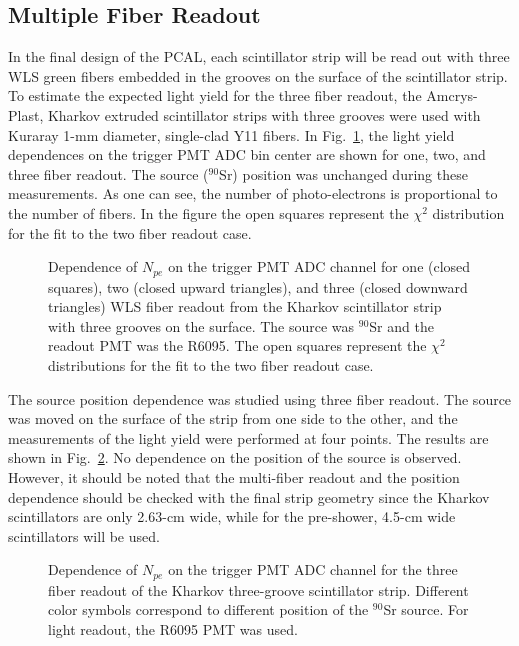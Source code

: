 \subsection{Multiple Fiber Readout}

In the final design of the PCAL, each scintillator strip will be read out 
with three WLS green fibers embedded in the grooves on the surface of the
scintillator strip.  To estimate the expected light yield for the three 
fiber readout, the Amcrys-Plast, Kharkov extruded scintillator strips with
three grooves were used with Kuraray 1-mm diameter, single-clad Y11 fibers. 
In Fig.~\ref{fig:13f}, the light yield dependences on the trigger PMT ADC 
bin center are shown for one, two, and three fiber readout. The source 
($^{90}$Sr) position was unchanged during these measurements.  As one can 
see, the number of photo-electrons is proportional to the number of fibers. 
In the figure the open squares represent the $\chi^2$ distribution for the 
fit to the two fiber readout case.

\begin{figure}[ht!]
\vspace{12.0cm} 
\caption{\small{Dependence of $N_{pe}$ on the trigger PMT ADC channel for one 
(closed squares), two (closed upward triangles), and three (closed downward 
triangles) WLS fiber readout from the Kharkov scintillator strip with three 
grooves on the surface. The source was $^{90}$Sr and the readout PMT was the 
R6095.  The open squares represent the $\chi^2$ distributions for the fit to 
the two fiber readout case.}} 
\label{fig:13f}
\end{figure}

The source position dependence was studied using three fiber readout.  The
source was moved on the surface of the strip from one side to the other, and 
the measurements of the light yield were performed at four points.  The 
results are shown in Fig.~\ref{fig:coord}.  No dependence on the position 
of the source is observed.  However, it should be noted that the multi-fiber 
readout and the position dependence should be checked with the final strip 
geometry since the Kharkov scintillators are only 2.63-cm wide, while for 
the pre-shower, 4.5-cm wide scintillators will be used.

\begin{figure}[ht!]
\vspace{110mm} 
\caption{\small{Dependence of $N_{pe}$ on the trigger PMT ADC channel for 
the three fiber readout of the Kharkov three-groove scintillator strip. 
Different color symbols correspond to different position of the $^{90}$Sr 
source. For light readout, the R6095 PMT was used.}} 
\label{fig:coord}
\end{figure}

